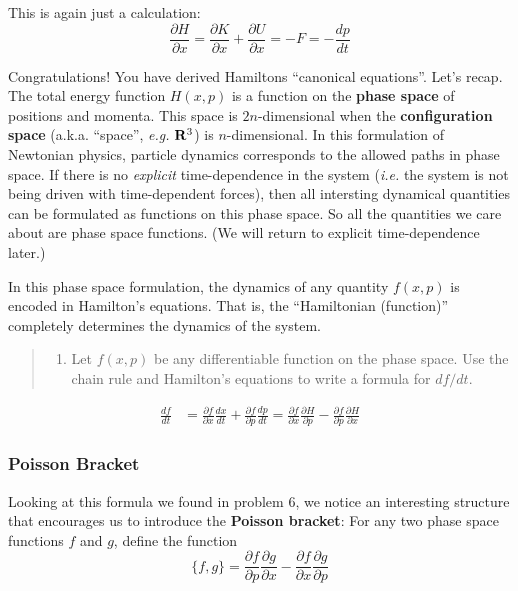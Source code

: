 \documentclass[
  letterpaper,
  DIV=11,
  numbers=noendperiod]{scrartcl}
\providecommand{\tightlist}{%
  \setlength{\itemsep}{0pt}\setlength{\parskip}{0pt}}
\begin{document}
This is again just a calculation: \[
\frac{\partial H}{\partial x}=\frac{\partial K}{\partial x}+\frac{\partial U}{\partial x}=-F=-\frac{d p}{dt}
\]

Congratulations! You have derived Hamiltons ``canonical equations''.
Let's recap. The total energy function \(H(x,p)\) is a function on the
\textbf{phase space} of positions and momenta. This space is
\(2n\)-dimensional when the \textbf{configuration space} (a.k.a.
``space'', \emph{e.g.} \({\bf R}^3\)) is \(n\)-dimensional. In this
formulation of Newtonian physics, particle dynamics corresponds to the
allowed paths in phase space. If there is no \emph{explicit}
time-dependence in the system (\emph{i.e.} the system is not being
driven with time-dependent forces), then all intersting dynamical
quantities can be formulated as functions on this phase space. So all
the quantities we care about are phase space functions. (We will return
to explicit time-dependence later.)

In this phase space formulation, the dynamics of any quantity \(f(x,p)\)
is encoded in Hamilton's equations. That is, the ``Hamiltonian
(function)'' completely determines the dynamics of the system.

\begin{quote}
\begin{enumerate}
\def\labelenumi{\arabic{enumi}.}
\setcounter{enumi}{6}
\tightlist
\item
  Let \(f(x,p)\) be any differentiable function on the phase space. Use
  the chain rule and Hamilton's equations to write a formula for
  \(df/dt\).
\end{enumerate}
\end{quote}

\begin{align}
\frac{df}{dt} &= \frac{\partial f}{\partial x}\frac{dx}{dt} + \frac{\partial f}{\partial p}\frac{dp}{dt} 
=\frac{\partial f}{\partial x}\frac{\partial H}{\partial p} - \frac{\partial f}{\partial p}\frac{\partial H}{\partial x}
\end{align}

\subsubsection{Poisson Bracket}\label{poisson-bracket}

Looking at this formula we found in problem 6, we notice an interesting
structure that encourages us to introduce the \textbf{Poisson bracket}:
For any two phase space functions \(f\) and \(g\), define the function
\[
\{f, g\}=\frac{\partial f}{\partial p}\frac{\partial g}{\partial x} - \frac{\partial f}{\partial x}\frac{\partial g}{\partial p}
\]
\end{document}
